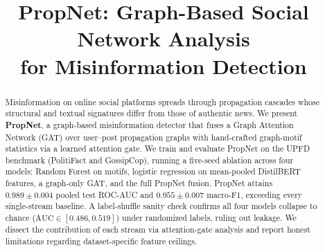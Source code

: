 \documentclass[conference]{IEEEtran}
\begin{document}
\title{PropNet: Graph-Based Social Network Analysis\\ for Misinformation Detection}

\author{
\and
{}
\and
{}
\and
{}
}

\maketitle

\begin{abstract}
Misinformation on online social platforms spreads through propagation cascades whose structural and textual signatures differ from those of authentic news. We present \textbf{PropNet}, a graph-based misinformation detector that fuses a Graph Attention Network (GAT) over user--post propagation graphs with hand-crafted graph-motif statistics via a learned attention gate. We train and evaluate PropNet on the UPFD benchmark (PolitiFact and GossipCop), running a five-seed ablation across four models: Random Forest on motifs, logistic regression on mean-pooled DistilBERT features, a graph-only GAT, and the full PropNet fusion. PropNet attains $0.989 \pm 0.004$ pooled test ROC-AUC and $0.955 \pm 0.007$ macro-F1, exceeding every single-stream baseline. A label-shuffle sanity check confirms all four models collapse to chance ($\mathrm{AUC} \in [0.486, 0.519]$) under randomized labels, ruling out leakage. We dissect the contribution of each stream via attention-gate analysis and report honest limitations regarding dataset-specific feature ceilings.
\end{abstract}
\end{document}

